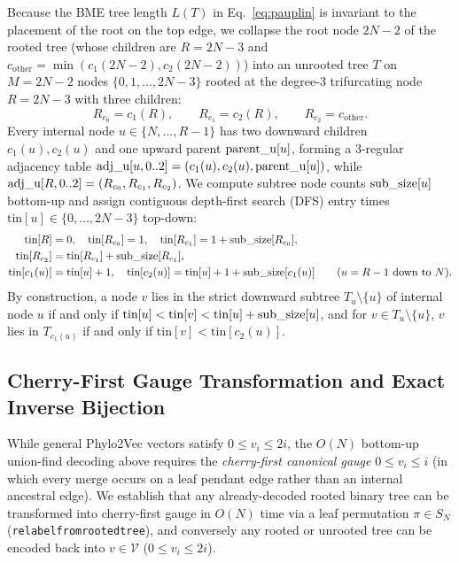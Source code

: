 \documentclass[11pt,a4paper]{article}
\makeatletter
\DeclareRobustCommand{\_}{\ifmmode\nfss@text{\textunderscore}\else\textunderscore\allowbreak\fi}
\theoremstyle{definition}
\makeatother
\begin{document}
Because the BME tree length $L(T)$ in Eq.~\eqref{eq:pauplin} is invariant to the placement of the root on the top edge, we collapse the root node $2N-2$ of the rooted tree (whose children are $R = 2N-3$ and $c_{\text{other}} = \min(c_1(2N-2), c_2(2N-2))$) into an unrooted tree $T$ on $M = 2N-2$ nodes $\{0, 1, \dots, 2N-3\}$ rooted at the degree-3 trifurcating node $R = 2N-3$ with three children:
\begin{equation}
R_{c_0} = c_1(R), \qquad R_{c_1} = c_2(R), \qquad R_{c_2} = c_{\text{other}}.
\end{equation}
Every internal node $u \in \{N, \dots, R-1\}$ has two downward children $c_1(u), c_2(u)$ and one upward parent $\text{parent\_u}[u]$, forming a 3-regular adjacency table $\text{adj\_u}[u, 0..2] = (c_1(u), c_2(u), \text{parent\_u}[u])$, while $\text{adj\_u}[R, 0..2] = (R_{c_0}, R_{c_1}, R_{c_2})$. We compute subtree node counts $\text{sub\_size}[u]$ bottom-up and assign contiguous depth-first search (DFS) entry times $\text{tin}[u] \in \{0, \dots, 2N-3\}$ top-down:
\begin{align}
\text{tin}[R] &= 0, \quad \text{tin}[R_{c_0}] = 1, \quad \text{tin}[R_{c_1}] = 1 + \text{sub\_size}[R_{c_0}], \nonumber \\
\text{tin}[R_{c_2}] &= \text{tin}[R_{c_1}] + \text{sub\_size}[R_{c_1}], \nonumber \\
\text{tin}[c_1(u)] &= \text{tin}[u] + 1, \quad \text{tin}[c_2(u)] = \text{tin}[u] + 1 + \text{sub\_size}[c_1(u)] \qquad (u = R-1 \text{ down to } N).
\label{eq:euler_tin}
\end{align}
By construction, a node $v$ lies in the strict downward subtree $T_u \setminus \{u\}$ of internal node $u$ if and only if $\text{tin}[u] < \text{tin}[v] < \text{tin}[u] + \text{sub\_size}[u]$, and for $v \in T_u \setminus \{u\}$, $v$ lies in $T_{c_1(u)}$ if and only if $\text{tin}[v] < \text{tin}[c_2(u)]$.

\subsection{Cherry-First Gauge Transformation and Exact Inverse Bijection}
\label{sec:gauge}

While general Phylo2Vec vectors satisfy $0 \le v_i \le 2i$, the $O(N)$ bottom-up union-find decoding above requires the \emph{cherry-first canonical gauge} $0 \le v_i \le i$ (in which every merge occurs on a leaf pendant edge rather than an internal ancestral edge). We establish that any already-decoded rooted binary tree can be transformed into cherry-first gauge in $O(N)$ time via a leaf permutation $\pi \in S_N$ (\texttt{relabel\_from\_rooted\_tree}), and conversely any rooted or unrooted tree can be encoded back into $v \in \mathcal{V}$ ($0 \le v_i \le 2i$).
\end{document}
